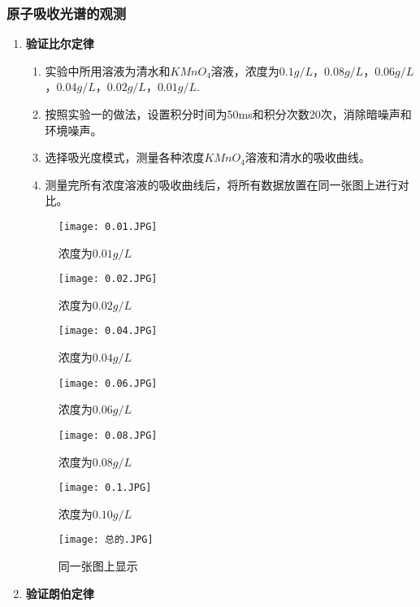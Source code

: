 \documentclass[dvipsnames, svgnames,a4paper,11pt]{article}
\begin{document}
	\subsubsection{原子吸收光谱的观测}
	\begin{enumerate}
		\item \textbf{验证比尔定律}
			
			\begin{enumerate}
				\item 实验中所用溶液为清水和$KMnO_4$溶液，浓度为$0.1g/L$，$0.08g/L$，$0.06g/L$，$0.04g/L$，$0.02g/L$，$0.01g/L$.
				
				\item 按照实验一的做法，设置积分时间为50ms和积分次数20次，消除暗噪声和环境噪声。
				
				\item 选择吸光度模式，测量各种浓度$KMnO_4$溶液和清水的吸收曲线。
				
				\item 测量完所有浓度溶液的吸收曲线后，将所有数据放置在同一张图上进行对比。
				
			\end{enumerate}
			\begin{figure}[{H}]
				\centering
				\texttt{[image: 0.01.JPG]}
				\caption{浓度为$0.01g/L$}
				\label{}
			\end{figure}
			
			\begin{figure}[H]
				\centering
				\texttt{[image: 0.02.JPG]}
				\caption{浓度为$0.02g/L$}
				\label{fig:conc_0_02}
			\end{figure}
			
			\begin{figure}[H]
				\centering
				\texttt{[image: 0.04.JPG]}
				\caption{浓度为$0.04g/L$}
				\label{fig:conc_0_04}
			\end{figure}
			
			\begin{figure}[H]
				\centering
				\texttt{[image: 0.06.JPG]}
				\caption{浓度为$0.06g/L$}
				\label{fig:conc_0_06}
			\end{figure}
			
			\begin{figure}[H]
				\centering
				\texttt{[image: 0.08.JPG]}
				\caption{浓度为$0.08g/L$}
				\label{fig:conc_0_08}
			\end{figure}
			
			\begin{figure}[H]
				\centering
				\texttt{[image: 0.1.JPG]}
				\caption{浓度为$0.10g/L$}
				\label{fig:conc_0_10}
			\end{figure}
			\begin{figure}[H]
				\centering
				\texttt{[image: 总的.JPG]}
				\caption{同一张图上显示}
				\label{fig:conc_0_10}
			\end{figure}
			\item \textbf{验证朗伯定律}
			

\end{enumerate}
\end{document}
